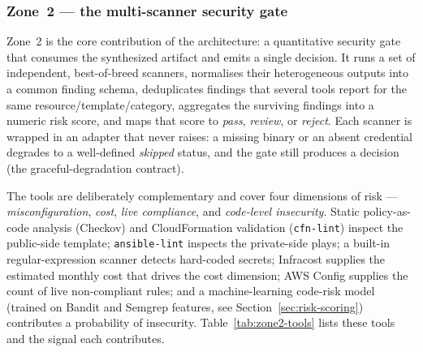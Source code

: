 \subsubsection{Zone~2 --- the multi-scanner security gate}
\label{subsubsec:zone2}

Zone~2 is the core contribution of the architecture: a quantitative security gate that
consumes the synthesized artifact and emits a single decision. It runs a set of
independent, best-of-breed scanners, normalises their heterogeneous outputs into a common
finding schema, deduplicates findings that several tools report for the same
resource/template/category, aggregates the surviving findings into a numeric risk score,
and maps that score to \emph{pass}, \emph{review}, or \emph{reject}. Each scanner is
wrapped in an adapter that never raises: a missing binary or an absent credential
degrades to a well-defined \emph{skipped} status, and the gate still produces a decision
(the graceful-degradation contract).

The tools are deliberately complementary and cover four dimensions of risk ---
\emph{misconfiguration}, \emph{cost}, \emph{live compliance}, and \emph{code-level
insecurity}. Static policy-as-code analysis (Checkov) and CloudFormation validation
(\texttt{cfn-lint}) inspect the public-side template; \texttt{ansible-lint} inspects the
private-side plays; a built-in regular-expression scanner detects hard-coded secrets;
Infracost supplies the estimated monthly cost that drives the cost dimension; AWS Config
supplies the count of live non-compliant rules; and a machine-learning code-risk model
(trained on Bandit and Semgrep features, see Section~\ref{sec:risk-scoring}) contributes a
probability of insecurity. Table~\ref{tab:zone2-tools} lists these tools and the signal
each contributes.

